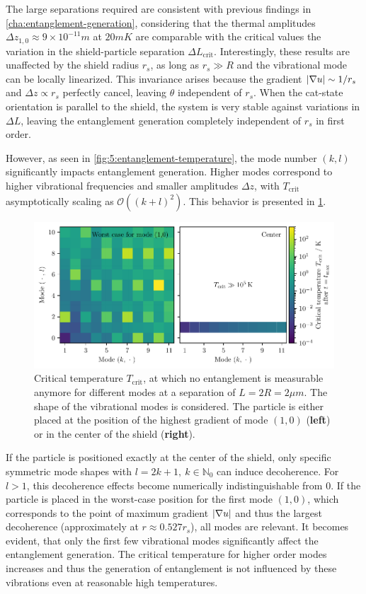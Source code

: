 The large separations required are consistent with previous findings in \cref{cha:entanglement-generation}, considering that the thermal amplitudes $\Delta z_{1,0} \approx 9 \times 10^{-11}\si{m}$ at $20\si{mK}$ are comparable with the critical values the variation in the shield-particle separation $\Delta L_\mathrm{crit}$.
Interestingly, these results are unaffected by the shield radius $r_s$, as long as $r_s \gg R$ and the vibrational mode can be locally linearized.
This invariance arises because the gradient $\left\lvert\nabla u\right\rvert \sim 1/r_s$ and $\Delta z \propto r_s$ perfectly cancel, leaving $\theta$ independent of $r_s$. 
When the cat-state orientation is parallel to the shield, the system is very stable against variations in $\Delta L$, leaving the entanglement generation completely independent of $r_s$ in first order.

However, as seen in \cref{fig:5:entanglement-temperature}, the mode number $(k, l)$ significantly impacts entanglement generation.
Higher modes correspond to higher vibrational frequencies and smaller amplitudes $\Delta z$, with $T_\mathrm{crit}$ asymptotically scaling as $\mathcal{O}((k + l)^2)$. 
This behavior is presented in \cref{fig:5:T-crit-modes}.
\begin{figure}[!htbp]
  \centering
  \includegraphics[width=\textwidth]{./../figures/vibrations/T-crit-modes.pdf}
  \caption{Critical temperature $T_\mathrm{crit}$, at which no entanglement is measurable anymore for different modes at a separation of $L = 2R = 2\si{\mu m}$. The shape of the vibrational modes is considered. The particle is either placed at the position of the highest gradient of mode $(1,0)$ (\textbf{left}) or in the center of the shield (\textbf{right}).}
  \label{fig:5:T-crit-modes}
\end{figure}
If the particle is positioned exactly at the center of the shield, only specific symmetric mode shapes with $l=2k+1,\ k\in\mathbb{N}_0$ can induce decoherence.
For $l > 1$, this decoherence effects become numerically indistinguishable from $0$.
If the particle is placed in the worst-case position for the first mode $(1,0)$, which corresponds to the point of maximum gradient $\left\lvert\nabla u\right\rvert$ and thus the largest decoherence (approximately at $r \approx 0.527 r_s$), all modes are relevant.
It becomes evident, that only the first few vibrational modes significantly affect the entanglement generation.
The critical temperature for higher order modes increases and thus the generation of entanglement is not influenced by these vibrations even at reasonable high temperatures.

